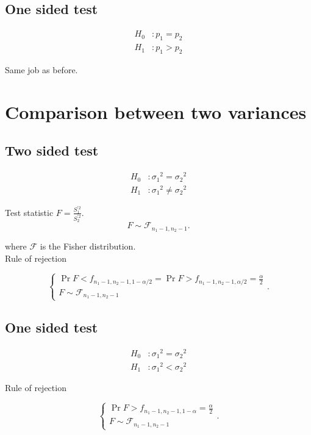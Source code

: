 \documentclass{report}
\begin{document}
\subsection{One sided test}

\begin{align*}
	H_0 & : p_1 = p_2 \\
	H_1 & : p_1 > p_2
\end{align*}

Same job as before.

\section{Comparison between two variances}

\subsection{Two sided test}

\begin{align*}
	H_0 & : {\sigma_1}^2 = {\sigma_2}^2    \\
	H_1 & : {\sigma_1}^2 \neq {\sigma_2}^2
\end{align*}

Test statistic $F = \frac{S_1^{'2}}{S_2^{'2}}$.\\

\[
	F \sim \mathcal{F}_{n_1-1,n_2-1}
	.\]

where $\mathcal{F}$ is the Fisher distribution.\\

Rule of rejection

\[
	\begin{cases}
		\Pr{F<f_{n_1-1,n_2-1,1-\alpha/2}} = \Pr{F>f_{n_1-1,n_2-1,\alpha/2}} = \frac{\alpha}{2} \\
		F\sim \mathcal{F}_{n_1-1,n_2-1}
	\end{cases}
	.\]

\subsection{One sided test}

\begin{align*}
	H_0 & : {\sigma_1}^2 = {\sigma_2}^2 \\
	H_1 & : {\sigma_1}^2 < {\sigma_2}^2
\end{align*}

Rule of rejection

\[
	\begin{cases}
		\Pr{F>f_{n_1-1,n_2-1,1-\alpha}} = \frac{\alpha}{2} \\
		F\sim \mathcal{F}_{n_1-1,n_2-1}
	\end{cases}
	.\]
\end{document}
